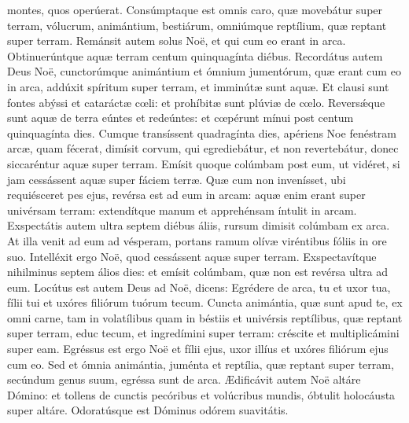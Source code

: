 \begin{paracol}{2}
{montes, quos operúerat. Consúmptaque est omnis caro, quæ movebátur super terram, vólucrum, animántium, bestiárum, omniúmque reptílium, quæ reptant super terram. Remánsit autem solus Noë, et qui cum eo erant in arca. Obtinuerúntque aquæ terram centum quinquagínta diébus. Recordátus autem Deus Noë, cunctorúmque animántium et ómnium jumentórum, quæ erant cum eo in arca, addúxit spíritum super terram, et imminútæ sunt aquæ. Et clausi sunt fontes abýssi et cataráctæ cœli: et prohíbitæ sunt plúviæ de cœlo. Reversǽque sunt aquæ de terra eúntes et redeúntes: et cœpérunt mínui post centum quinquagínta dies. Cumque transíssent quadragínta dies, apériens Noe fenéstram arcæ, quam fécerat, dimísit corvum, qui egrediebátur, et non revertebátur, donec siccaréntur aquæ super terram. Emísit quoque colúmbam post eum, ut vidéret, si jam cessássent aquæ super fáciem terræ. Quæ cum non invenísset, ubi requiésceret pes ejus, revérsa est ad eum in arcam: aquæ enim erant super univérsam terram: extendítque manum et apprehénsam íntulit in arcam. Exspectátis autem ultra septem diébus áliis, rursum dimisit colúmbam ex arca. At illa venit ad eum ad vésperam, portans ramum olívæ viréntibus fóliis in ore suo. Intelléxit ergo Noë, quod cessássent aquæ super terram. Exspectavítque nihilminus septem álios dies: et emísit colúmbam, quæ non est revérsa ultra ad eum. Locútus est autem Deus ad Noë, dicens: Egrédere de arca, tu et uxor tua, fílii tui et uxóres filiórum tuórum tecum. Cuncta animántia, quæ sunt apud te, ex omni carne, tam in volatílibus quam in béstiis et univérsis reptílibus, quæ reptant super terram, educ tecum, et ingredímini super terram: créscite et multiplicámini super eam. Egréssus est ergo Noë et fílii ejus, uxor illíus et uxóres filiórum ejus cum eo. Sed et ómnia animántia, juménta et reptília, quæ reptant super terram, secúndum genus suum, egréssa sunt de arca. Ædificávit autem Noë altáre Dómino: et tollens de cunctis pecóribus et volúcribus mundis, óbtulit holocáusta super altáre. Odoratúsque est Dóminus odórem suavitátis.
}\switchcolumn\portugues{
}
\end{paracol}

